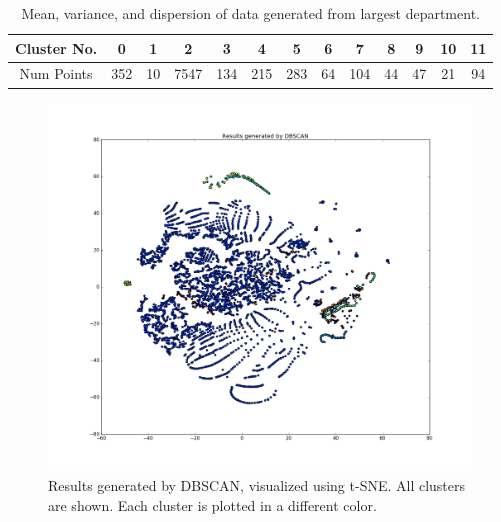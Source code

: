 \begin{table}[!ht]
	\caption{Mean, variance, and dispersion of data generated from largest department.}
	\begin{center}
		\begin{tabular}{|c|c|c|c|c|c|c|c|c|c|c|c|c|}
			\hline
			Cluster No. &    0 & 1  & 2    & 3   & 4   & 5   & 6  & 7   & 8  & 9  & 10 & 11	\\ \hline
			Num Points  &  352 & 10 & 7547 & 134 & 215 & 283 & 64 & 104 & 44 & 47 & 21 & 94 \\
			\hline

		\end{tabular}
	\end{center}
	\label{tab:ClusterResult}
\end{table}

\begin{figure}[!ht]
	\begin{center}
		\includegraphics[width=\textwidth]{images/ClusterResult}
		\caption{Results generated by DBSCAN, visualized using t-SNE. All clusters are shown. Each cluster is plotted in a different color.}
		\label{fig:ClusterResult}
	\end{center}
\end{figure}

